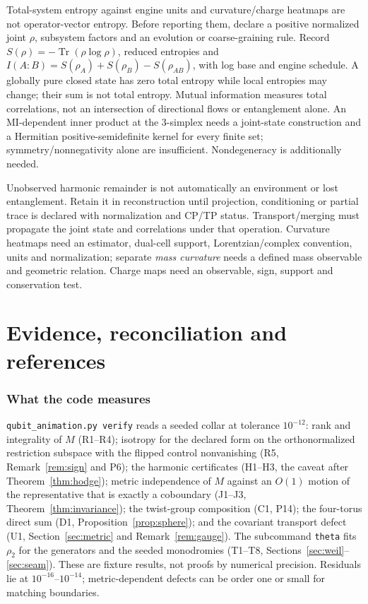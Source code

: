 \documentclass[11pt]{article}
\theoremstyle{definition}
\theoremstyle{remark}
\newcommand{\Tr}{\operatorname{Tr}}
\begin{document}
Total-system entropy against engine units and curvature/charge heatmaps
are not operator-vector entropy. Before reporting them, declare a positive
normalized joint $\rho$, subsystem factors and an evolution or
coarse-graining rule. Record
$S(\rho)=-\Tr(\rho\log\rho)$, reduced entropies and
$I(A:B)=S(\rho_A)+S(\rho_B)-S(\rho_{AB})$, with log base and engine schedule.
A globally pure closed state has zero total entropy while local entropies
may change; their sum is not total entropy.
Mutual information measures total correlations, not an intersection of
directional flows or entanglement alone. An MI-dependent inner product at
the $3$-simplex needs a joint-state construction and a Hermitian
positive-semidefinite kernel for every finite set; symmetry/nonnegativity
alone are insufficient. Nondegeneracy is additionally needed.

Unobserved harmonic remainder is not automatically an environment or lost
entanglement. Retain it in reconstruction until projection, conditioning or
partial trace is declared with normalization and CP/TP status.
Transport/merging must propagate the joint state and correlations under
that operation. Curvature heatmaps need an estimator, dual-cell support,
Lorentzian/complex convention, units and normalization; separate
\emph{mass curvature} needs a defined mass observable and geometric relation.
Charge maps need an observable, sign, support and conservation test.

\part{Evidence, reconciliation and references}

\section{What the code measures}

\texttt{qubit\_animation.py verify} reads a seeded collar at tolerance
$10^{-12}$: rank and integrality of $M$ (R1--R4);
isotropy for the declared form on the orthonormalized restriction subspace
with the flipped control nonvanishing (R5, Remark~\ref{rem:sign} and P6);
the harmonic certificates (H1--H3, the caveat after Theorem~\ref{thm:hodge});
metric independence of $M$ against an $O(1)$ motion of the representative
that is exactly a coboundary (J1--J3, Theorem~\ref{thm:invariance}); the
twist-group composition (C1, P14); the four-torus direct sum (D1,
Proposition~\ref{prop:sphere}); and the covariant transport defect (U1,
Section~\ref{sec:metric} and Remark~\ref{rem:gauge}). The subcommand
\texttt{theta} fits $\rho_2$ for the generators and the seeded monodromies
(T1--T8, Sections~\ref{sec:weil}--\ref{sec:seam}). These are fixture
results, not proofs by numerical precision. Residuals lie at
$10^{-16}$--$10^{-14}$; metric-dependent defects can be order one or small
for matching boundaries.
\end{document}
